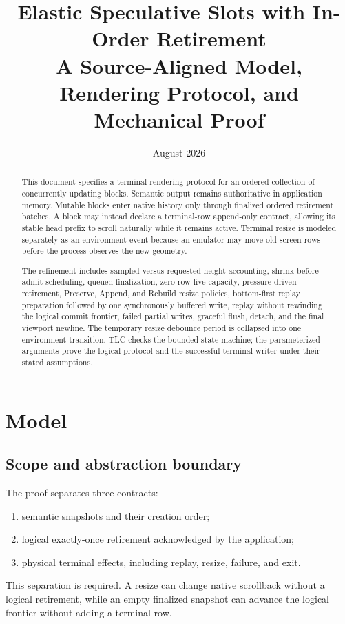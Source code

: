 \documentclass[11pt]{article}
\title{Elastic Speculative Slots with In-Order Retirement\\
\large A Source-Aligned Model, Rendering Protocol, and Mechanical Proof}
\author{}
\date{August 2026}
\theoremstyle{definition}
\begin{document}
\maketitle

\begin{abstract}
This document specifies a terminal rendering protocol for an ordered collection
of concurrently updating blocks.  Semantic output remains authoritative in
application memory.  Mutable blocks enter native history only through finalized
ordered retirement batches.  A block may instead declare a terminal-row
append-only contract, allowing its stable head prefix to scroll naturally while
it remains active.  Terminal resize is
modeled separately as an environment event because an emulator may move old
screen rows before the process observes the new geometry.

The refinement includes sampled-versus-requested height accounting,
shrink-before-admit scheduling, queued finalization, zero-row live capacity,
pressure-driven retirement, Preserve, Append, and Rebuild resize policies,
bottom-first replay preparation followed by one synchronously buffered write,
replay without rewinding the logical commit frontier, failed partial writes,
graceful flush, detach, and the final viewport newline.  The temporary resize
debounce period is collapsed into one environment transition.  TLC checks the bounded
state machine; the parameterized arguments prove the logical protocol and the
successful terminal writer under their stated assumptions.
\end{abstract}

\tableofcontents

\section{Model}
\label{sec:model}

\subsection{Scope and abstraction boundary}

The proof separates three contracts:
\begin{enumerate}
  \item semantic snapshots and their creation order;
  \item logical exactly-once retirement acknowledged by the application;
  \item physical terminal effects, including replay, resize, failure, and exit.
\end{enumerate}
This separation is required.  A resize can change native scrollback without a
logical retirement, while an empty finalized snapshot can advance the logical
frontier without adding a terminal row.
\end{document}

